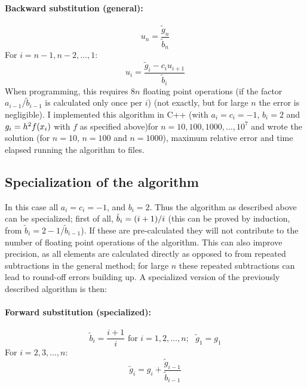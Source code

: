 \documentclass[a4paper,english]{article}
\let\originalleft\left
\let\originalright\right
\renewcommand{\left}{\mathopen{}\mathclose\bgroup\originalleft}
\renewcommand{\right}{\aftergroup\egroup\originalright}
\begin{document}
\paragraph{Backward substitution (general):}
\begin{equation}
  u_n = \frac{\tilde{g}_n}{\tilde{b}_n}
\end{equation}
For $i = n-1, n-2, \dots, 1$:
\begin{equation}
  u_i = \frac{\tilde{g}_i-c_iu_{i+1}}{\tilde{b}_i}
\end{equation}
When programming, this requires $8n$ floating point operations (if the factor $a_{i-1}/\tilde{b}_{i-1}$ is calculated only once per $i$) (not exactly, but for large $n$ the error is negligible). I implemented this algorithm in C++ (with $a_i = c_i = -1$, $b_i = 2$ and $g_i = h^2f\left(x_i\right)$ with $f$ as specified above)for $n = 10,100,1000,\dots,10^7$ and wrote the solution (for $n=10$, $n=100$ and $n=1000$), maximum relative error and time elapsed running the algorithm to files.
\subsection{Specialization of the algorithm}
In this case all $a_i = c_i = -1$, and $b_i = 2$. Thus the algorithm as described above can be specialized; first of all, $\tilde{b}_i = \left(i+1\right)/i$ (this can be proved by induction, from $\tilde{b}_i = 2-1/\tilde{b}_{i-1}$). If these are pre-calculated they will not contribute to the number of floating point operations of the algorithm. This can also improve precision, as all elements are calculated directly as opposed to from repeated subtractions in the general method; for large $n$ these repeated subtractions can lead to round-off errors building up. A specialized version of the previously described algorithm is then:
\paragraph{Forward substitution (specialized):}
\begin{equation}
  \tilde{b}_i = \frac{i+1}{i} \text{ for }i=1,2,\dots,n;\text{ }\tilde{g}_1 = g_1
\end{equation}
For $i = 2,3,\dots,n$:
\begin{equation}
  \tilde{g}_i = g_i+\frac{\tilde{g}_{i-1}}{\tilde{b}_{i-1}}
\end{equation}
\end{document}
